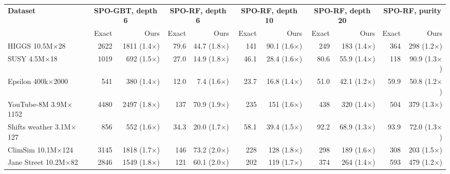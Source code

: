     \begin{tabular}{l|rr|rr|rr|rr|rr}
        \hline
        \multirow{2}{*}{\textbf{Dataset}} & \multicolumn{2}{c|}{\textbf{SPO-GBT, depth 6}} & \multicolumn{2}{c|}{\textbf{SPO-RF, depth 6}} & \multicolumn{2}{c|}{\textbf{SPO-RF, depth 10}} & \multicolumn{2}{c|}{\textbf{SPO-RF, depth 20}} & \multicolumn{2}{c}{\textbf{SPO-RF, purity}} \\
         & Exact & Ours & Exact & Ours & Exact & Ours & Exact & Ours & Exact & Ours \\
        \hline
        HIGGS 10.5M$\times$28 & 2622 & 1811 (1.4$\times$) & 79.6 & 44.7 (1.8$\times$) & 141 & 90.1 (1.6$\times$) & 249 & 183 (1.4$\times$) & 364 & 298 (1.2$\times$) \\
        SUSY 4.5M$\times$18 & 1019 & 692 (1.5$\times$) & 27.0 & 14.9 (1.8$\times$) & 46.1 & 28.4 (1.6$\times$) & 80.6 & 55.9 (1.4$\times$) & 118 & 90.9 (1.3$\times$) \\
        Epsilon 400k$\times$2000 & 541 & 380 (1.4$\times$) & 12.0 & 7.4 (1.6$\times$) & 23.7 & 16.8 (1.4$\times$) & 51.0 & 42.1 (1.2$\times$) & 59.9 & 50.8 (1.2$\times$) \\
        YouTube-8M 3.9M$\times$1152 & 4480 & 2497 (1.8$\times$) & 137 & 70.9 (1.9$\times$) & 235 & 151 (1.6$\times$) & 438 & 320 (1.4$\times$) & 504 & 379 (1.3$\times$) \\
        Shifts weather 3.1M$\times$127 & 856 & 552 (1.6$\times$) & 34.3 & 20.0 (1.7$\times$) & 58.1 & 39.4 (1.5$\times$) & 92.2 & 68.9 (1.3$\times$) & 93.9 & 72.0 (1.3$\times$) \\
        ClimSim 10.1M$\times$124 & 3145 & 1818 (1.7$\times$) & 146 & 73.2 (2.0$\times$) & 228 & 128 (1.8$\times$) & 298 & 189 (1.6$\times$) & 308 & 203 (1.5$\times$) \\
        Jane Street 10.2M$\times$82 & 2846 & 1549 (1.8$\times$) & 121 & 60.1 (2.0$\times$) & 202 & 119 (1.7$\times$) & 374 & 264 (1.4$\times$) & 593 & 479 (1.2$\times$) \\
        \hline
    \end{tabular}
